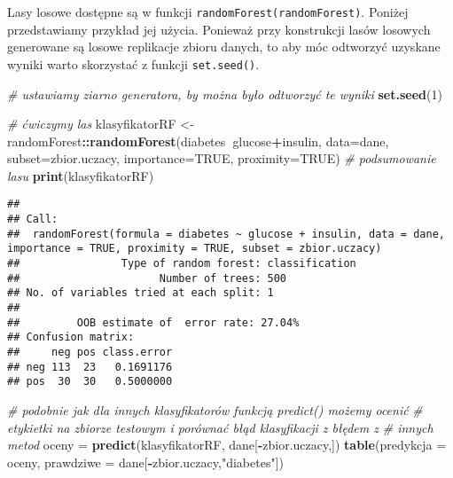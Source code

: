 \documentclass[polish,]{book}
\newenvironment{Shaded}{\begin{snugshade}}{\end{snugshade}}
\newcommand{\CommentTok}[1]{\textcolor[rgb]{0.56,0.35,0.01}{\textit{#1}}}
\newcommand{\DataTypeTok}[1]{\textcolor[rgb]{0.13,0.29,0.53}{#1}}
\newcommand{\DecValTok}[1]{\textcolor[rgb]{0.00,0.00,0.81}{#1}}
\newcommand{\KeywordTok}[1]{\textcolor[rgb]{0.13,0.29,0.53}{\textbf{#1}}}
\newcommand{\NormalTok}[1]{#1}
\newcommand{\OperatorTok}[1]{\textcolor[rgb]{0.81,0.36,0.00}{\textbf{#1}}}
\newcommand{\OtherTok}[1]{\textcolor[rgb]{0.56,0.35,0.01}{#1}}
\newcommand{\StringTok}[1]{\textcolor[rgb]{0.31,0.60,0.02}{#1}}
\begin{document}
Lasy losowe dostępne są w funkcji \texttt{randomForest(randomForest)}. Poniżej przedstawiamy przykład jej użycia. Ponieważ przy konstrukcji lasów losowych generowane
są losowe replikacje zbioru danych, to aby móc odtworzyć uzyskane wyniki warto
skorzystać z funkcji \texttt{set.seed()}.

\begin{Shaded}
\begin{Highlighting}[]
\CommentTok{# ustawiamy ziarno generatora, by można było odtworzyć te wyniki}
\KeywordTok{set.seed}\NormalTok{(}\DecValTok{1}\NormalTok{)}

\CommentTok{# ćwiczymy las}
\NormalTok{klasyfikatorRF <-}\StringTok{ }\NormalTok{randomForest}\OperatorTok{::}\KeywordTok{randomForest}\NormalTok{(diabetes}\OperatorTok{~}\NormalTok{glucose}\OperatorTok{+}\NormalTok{insulin,}
                                             \DataTypeTok{data=}\NormalTok{dane,}
                                             \DataTypeTok{subset=}\NormalTok{zbior.uczacy, }\DataTypeTok{importance=}\OtherTok{TRUE}\NormalTok{, }\DataTypeTok{proximity=}\OtherTok{TRUE}\NormalTok{)}
\CommentTok{# podsumowanie lasu}
\KeywordTok{print}\NormalTok{(klasyfikatorRF)}
\end{Highlighting}
\end{Shaded}

\begin{verbatim}
## 
## Call:
##  randomForest(formula = diabetes ~ glucose + insulin, data = dane,      importance = TRUE, proximity = TRUE, subset = zbior.uczacy) 
##                Type of random forest: classification
##                      Number of trees: 500
## No. of variables tried at each split: 1
## 
##         OOB estimate of  error rate: 27.04%
## Confusion matrix:
##     neg pos class.error
## neg 113  23   0.1691176
## pos  30  30   0.5000000
\end{verbatim}

\begin{Shaded}
\begin{Highlighting}[]
\CommentTok{# podobnie jak dla innych klasyfikatorów funkcją predict() możemy ocenić}
\CommentTok{# etykietki na zbiorze testowym i porównać błąd klasyfikacji z błędem z}
\CommentTok{# innych metod}
\NormalTok{oceny =}\StringTok{ }\KeywordTok{predict}\NormalTok{(klasyfikatorRF, dane[}\OperatorTok{-}\NormalTok{zbior.uczacy,])}
\KeywordTok{table}\NormalTok{(}\DataTypeTok{predykcja =}\NormalTok{ oceny, }\DataTypeTok{prawdziwe =}\NormalTok{ dane[}\OperatorTok{-}\NormalTok{zbior.uczacy,}\StringTok{"diabetes"}\NormalTok{])}
\end{Highlighting}
\end{Shaded}
\end{document}
